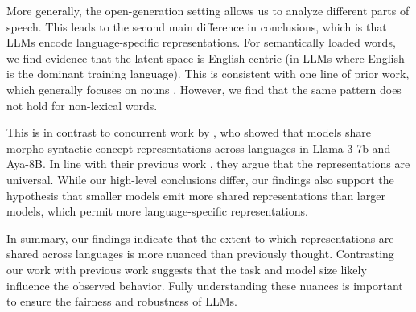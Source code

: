 More generally, the open-generation setting allows us to analyze different parts of speech. 
This leads to the second main difference in conclusions, which is that LLMs encode language-specific representations. 
For semantically loaded words, we find evidence that the latent space is English-centric (in LLMs where English is the dominant training language). 
This is consistent with one line of prior work, which generally focuses on nouns \citep{wu2024semantic, zhong2024beyond}.
However, we find that the same pattern does not hold for non-lexical words. 

This is in contrast to concurrent work by \citet{brinkmann2025large}, who showed that models share morpho-syntactic concept representations across languages in Llama-3-7b and Aya-8B. In line with their previous work \citep{wendler2024llamasworkenglishlatent}, they argue that the representations are universal. 
While our high-level conclusions differ, our findings also support the hypothesis that smaller models emit more shared representations than larger models, which permit more language-specific representations. 

In summary, our findings indicate that the extent to which representations are shared across languages is more nuanced than previously thought. 
Contrasting our work with previous work suggests that the task and model size likely influence the observed behavior. 
Fully understanding these nuances is important to ensure the fairness and robustness of LLMs.
